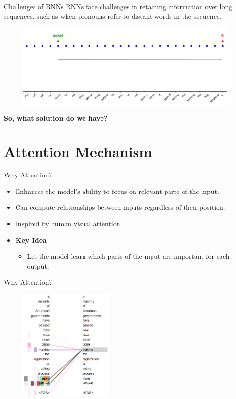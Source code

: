 \documentclass[serif, aspectratio=169]{beamer}
\begin{document}
\begin{frame}{Challenges of RNNs}
		RNNs face challenges in retaining information over long sequences, such as when pronouns refer to distant words in the sequence.
		\begin{figure}
			\centering
			\includegraphics[width=0.99\textwidth]{pic/RNN-challenges.png}
			\label{fig:RNN-challenges}
		\end{figure}
		\textbf{So, what solution do we have?}
\end{frame}

\section{Attention Mechanism}

\begin{frame}{Why Attention?}
	\begin{itemize}
		\item Enhances the model's ability to focus on relevant parts of the input.
		\item Can compute relationships between inputs regardless of their position.
		\item Inspired by human visual attention.
		\item \textbf{Key Idea}
		\begin{itemize}
			\item Let the model learn which parts of the input are important for each output.
		\end{itemize}
	\end{itemize}
\end{frame}

\begin{frame}{Why Attention?}
    \begin{figure}
        \centering
        \includegraphics[width=0.415\textwidth]{pic/Attention-1.png}
        \label{fig:Attention-1}
    \end{figure}
\end{frame}
\end{document}
